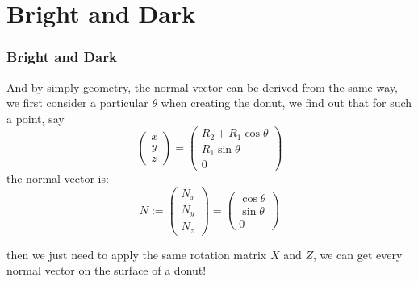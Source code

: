 \documentclass[12pt, t]{beamer}
\begin{document}
\section{Bright and Dark}
\begin{frame}
    \frametitle{Bright and Dark}

    And by simply geometry, the normal vector can be derived from the same way, we first consider a
    particular $\theta$ when creating the donut, we find out that for such a point, say
    \begin{equation*}
        \begin{pmatrix}
            x \\
            y \\
            z
        \end{pmatrix}
        =
        \begin{pmatrix}
            R_2 + R_1\cos{\theta} \\
            R_1\sin{\theta}       \\
            0
        \end{pmatrix}
    \end{equation*}
    the normal vector is:
    \begin{equation*}
        N :=
        \begin{pmatrix}
            N_x \\
            N_y \\
            N_z
        \end{pmatrix}
        =
        \begin{pmatrix}
            \cos\theta \\
            \sin\theta \\
            0
        \end{pmatrix}
    \end{equation*}

    then we just need to apply the same rotation matrix $X$ and $Z$, we can get every normal vector
    on the surface of a donut!

\end{frame}

\end{document}
